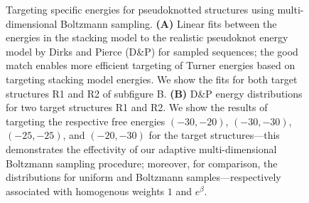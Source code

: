 \documentclass[]{bmcart}
\makeatletter
\newlength{\@aligneps}
\newcommand{\includegraphicstop}[2][]{%
\sbox{\@alignepsbox}{\texttt{[image: \#2]}}%
\setlength{\@aligneps}{-\ht\@alignepsbox}%
\addtolength{\@aligneps}{2ex}%
\raisebox{\@aligneps}{\usebox{\@alignepsbox}}}
\makeatother
\begin{document}
\begin{figure}[t]
  \begin{center}
    \includegraphicstop[width=0.97\textwidth]{Figs/energy_shift}\hfill
  \end{center}
  \caption{%
    Targeting specific energies for pseudoknotted structures using
    multi-dimensional Boltzmann sampling. \textbf{(A)} Linear fits between the
    energies in the stacking model to the realistic pseudoknot energy
    model by Dirks and Pierce (D\&P) for sampled sequences; the good
    match enables more efficient targeting of Turner energies based on
    targeting stacking model energies.  We show the fits for both
    target structures R1 and R2 of subfigure B.  \textbf{(B)} D\&P energy
    distributions for two target structures R1 and R2. We show the
    results of targeting the respective free energies $(-30,-20)$,
    $(-30,-30)$, $(-25,-25)$, and $(-20,-30)$ for the target
    structures---this demonstrates the effectivity of our adaptive
    multi-dimensional Boltzmann sampling procedure; moreover, for
    comparison, the distributions for uniform and Boltzmann
    samples---respectively associated with homogenous weights $1$ and
    $e^\beta$.
  }
  \label{fig:energydist-pk}
\end{figure}
\end{document}
